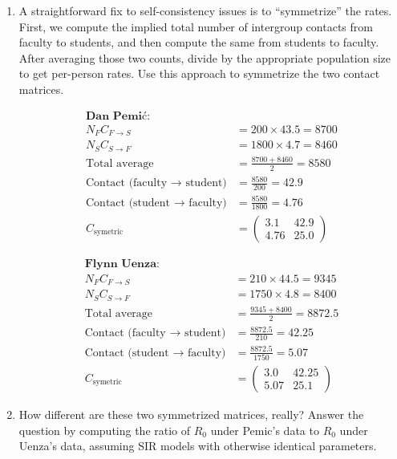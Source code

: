 \documentclass[11pt]{article}
\begin{document}
\begin{enumerate}
\begin{enumerate}[label=\alph*.]
\item A straightforward fix to self-consistency issues is to ``symmetrize'' the rates. First, we compute the implied total number of intergroup contacts from faculty to students, and then compute the same from students to faculty. After averaging those two counts, divide by the appropriate population size to get per-person rates. Use this approach to symmetrize the two contact matrices. 
\par
\begin{align*}
	\textbf{Dan Pemić:} \\
	N_F C_{F \to S} &= 200 \times 43.5 = 8700 \\
	N_S C_{S \to F} &= 1800 \times 4.7 = 8460 \\[6pt]
	\text{Total average} &= \frac{8700 + 8460}{2} = 8580 \\[12pt]
	\text{Contact (faculty $\to$ student)} &= \frac{8580}{200} = 42.9 \\[6pt]
	\text{Contact (student $\to$ faculty)} &= \frac{8580}{1800} = 4.76 \\[12pt]
	C_{\text{symetric}} &= 
	\begin{pmatrix}
	3.1 & 42.9 \\
	4.76 & 25.0
	\end{pmatrix}
\end{align*}

\begin{align*}
	\textbf{Flynn Uenza:} \\
	N_F C_{F \to S} &= 210 \times 44.5 = 9345 \\
	N_S C_{S \to F} &= 1750 \times 4.8 = 8400 \\[6pt]
	\text{Total average} &= \frac{9345 + 8400}{2} = 8872.5 \\[12pt]
	\text{Contact (faculty $\to$ student)} &= \frac{8872.5}{210} = 42.25 \\[6pt]
	\text{Contact (student $\to$ faculty)} &= \frac{8872.5}{1750} = 5.07 \\[12pt]
	C_{\text{symetric}} &= 
	\begin{pmatrix}
	3.0 & 42.25 \\
	5.07 & 25.1
	\end{pmatrix}
\end{align*}

\item How different are these two symmetrized matrices, really? Answer the question by computing the ratio of $R_0$ under Pemic's data to $R_0$ under Uenza's data, assuming SIR models with otherwise identical parameters.
\par


\end{enumerate}
\end{enumerate}
\end{document}
